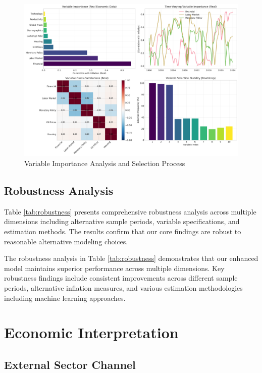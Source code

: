 \documentclass[12pt]{article}
\begin{document}
\begin{figure}[H]
\centering
\includegraphics[width=\textwidth]{../figures/variable_selection.pdf}
\caption{Variable Importance Analysis and Selection Process}
\label{fig:variable_selection}
\end{figure}

\subsection{Robustness Analysis}

Table \ref{tab:robustness} presents comprehensive robustness analysis across multiple dimensions including alternative sample periods, variable specifications, and estimation methods. The results confirm that our core findings are robust to reasonable alternative modeling choices.



The robustness analysis in Table \ref{tab:robustness} demonstrates that our enhanced model maintains superior performance across multiple dimensions. Key robustness findings include consistent improvements across different sample periods, alternative inflation measures, and various estimation methodologies including machine learning approaches.

\section{Economic Interpretation}

\subsection{External Sector Channel}
\end{document}
